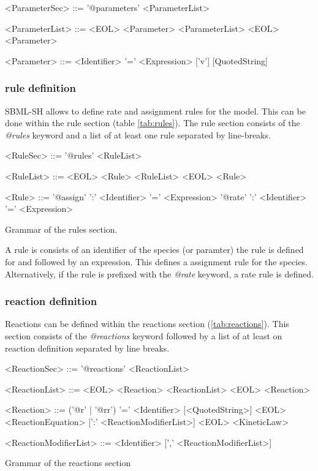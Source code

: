 \documentclass[a4paper]{article}
\begin{document}
\begin{table} [h!]
\begin{grammar}
<ParameterSec> ::= '@parameters' <ParameterList>

<ParameterList> ::= <EOL> <Parameter> <ParameterList>
  \alt <EOL> <Parameter>
  
<Parameter> ::= <Identifier> '=' <Expression> ['v'] [QuotedString]
\end{grammar}
\end{table}


\subsubsection*{rule definition}
SBML-SH allows to define rate and assignment rules for the model. This can be done within the rule section (table \ref{tab:rules}). The rule section consists of the \emph{@rules} keyword and a list of at least one rule separated by line-breaks. 

\begin{table}[h!]
\begin{grammar}
<RuleSec> ::= '@rules' <RuleList>

<RuleList> ::= <EOL> <Rule> <RuleList>
  \alt <EOL> <Rule>
  
<Rule> ::= '@assign' ':' <Identifier> '=' <Expression>
\alt '@rate' ':' <Identifier> '=' <Expression>
\end{grammar}
\caption{Grammar of the rules section.} \label{tab:rules}
\end{table}

A rule is consists of an identifier of the species (or paramter) the rule is defined for and followed by an expression. This defines a assignment rule for the species. Alternatively, if the rule is prefixed with the \emph{@rate} keyword, a rate rule is defined.


\subsubsection*{reaction definition}
Reactions can be defined within the reactions section (\ref{tab:reactions}). This section consists of the \emph{@reactions} keyword followed by a list of at least on reaction definition separated by line breaks. 

\begin{table}[h!]
\begin{grammar}
<ReactionSec> ::= '@reactions' <ReactionList>

<ReactionList> ::= <EOL> <Reaction> <ReactionList>
  \alt <EOL> <Reaction>
  
<Reaction> ::= ('@r' | '@rr') '=' <Identifier> [<QuotedString>] <EOL> <ReactionEquation> [':' <ReactionModifierList>] <EOL> <KineticLaw>

<ReactionModifierList> ::= <Identifier> [',' <ReactionModifierList>]
\end{grammar}
\caption{Grammar of the reactions section} \label{tab:reactions}
\end{table}
\end{document}
